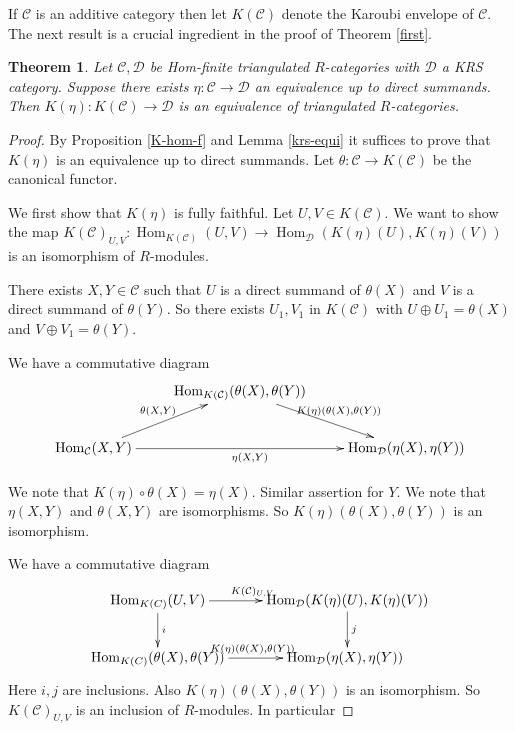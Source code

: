 \documentclass{amsart}
\newcommand{\D}{\mathcal{D} }
\newcommand{\C}{\mathcal{C}}
\newcommand{\rt}{\rightarrow}
\newcommand{\Hom}{\operatorname{Hom}}
\theoremstyle{plain}
\newtheorem{theorem}{Theorem}[section]
\theoremstyle{definition}
\theoremstyle{remark}
\begin{document}
{\s If $\C$ is an additive category then let $K(\C)$ denote the Karoubi envelope of $\C$.
The next result is a crucial ingredient in the proof of  Theorem \ref{first}.

\begin{theorem}
\label{crucial}
Let $\C, \D$ be Hom-finite triangulated $R$-categories with $\D$ a KRS category. Suppose there exists $\eta \colon \C \rt \D$ an equivalence up to direct summands. Then  $K(\eta) \colon K(\C) \rt \D$ is an equivalence of triangulated $R$-categories.
\end{theorem}
\begin{proof}
By Proposition \ref{K-hom-f} and   Lemma \ref{krs-equi} it suffices to prove that $K(\eta)$ is an equivalence up to direct summands. Let $\theta \colon \C \rt K(\C)$ be the  canonical functor.

We first show that $K(\eta)$ is  fully faithful. Let $U, V \in K(\C)$. We want to show
the map $K(\C)_{U,V} \colon \Hom_{K(\C)}(U, V) \rt \Hom_\D(K(\eta)(U), K(\eta)(V))$ is an isomorphism of $R$-modules.

There exists  $X, Y \in \C$ such that $U$ is a direct summand of $\theta(X)$ and $V$ is a direct summand of $\theta(Y)$. So there exists $U_1,V_1$ in $K(\C)$ with $U\oplus U_1 = \theta(X)$ and
$V \oplus V_1 = \theta(Y)$.

We have a commutative diagram
\[
\xymatrix{
\
&\Hom_{K(\C)}(\theta(X), \theta(Y))
\ar@{->}[dr]^{K(\eta)(\theta(X), \theta(Y))}
 \\
\Hom_\C(X, Y)
\ar@{->}[rr]_{\eta(X,Y)}
\ar@{->}[ur]^{\theta(X,Y)}
&\
&\Hom_\D(\eta(X), \eta(Y))
}
\]

We note that $K(\eta)\circ \theta(X) = \eta(X)$. Similar assertion for $Y$. We note that $\eta(X,Y)$ and  $\theta(X,Y)$ are isomorphisms. So $K(\eta)(\theta(X), \theta(Y))$ is an isomorphism.

We have a commutative diagram
\[
  \xymatrix
{
 \Hom_{K(C)}(U, V)
\ar@{->}[r]^{ K(\C)_{U,V} }
\ar@{->}[d]^{i}
 & \Hom_\D(K(\eta)(U), K(\eta)(V))
\ar@{->}[d]^{j}
\\
 \Hom_{K(C)}(\theta(X), \theta(Y))
 \ar@{->}[r]^{ K(\eta)(\theta(X), \theta(Y))  }
 & \Hom_\D(\eta(X), \eta(Y))
\
 }
\]
Here $i,j$ are inclusions. Also $K(\eta)(\theta(X), \theta(Y))$ is an isomorphism. So $K(\C)_{U,V}$ is an inclusion of $R$-modules. In particular


\end{proof}}
\end{document}
